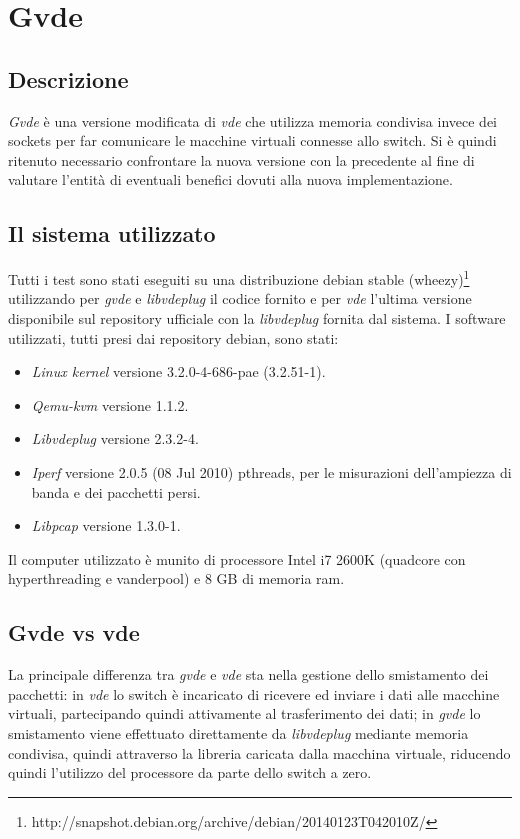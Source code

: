 \chapter{Gvde}
\section{Descrizione}
{\em Gvde} è una versione modificata di {\em vde} che utilizza memoria condivisa invece dei sockets per far comunicare le macchine virtuali connesse allo switch. Si è quindi ritenuto necessario confrontare la nuova versione con la precedente al fine di valutare l'entità di eventuali benefici dovuti alla nuova implementazione.
\section{Il sistema utilizzato}
Tutti i test sono stati eseguiti su una distribuzione debian stable (wheezy)\footnote{http://snapshot.debian.org/archive/debian/20140123T042010Z/} utilizzando per {\em gvde} e {\em libvdeplug} il codice fornito e per {\em vde} l'ultima versione disponibile sul repository ufficiale con la {\em libvdeplug} fornita dal sistema. I software utilizzati, tutti presi dai repository debian, sono stati:
\begin{itemize}
\item {\em Linux kernel} versione 3.2.0-4-686-pae (3.2.51-1).
\item {\em Qemu-kvm} versione 1.1.2.
\item {\em Libvdeplug} versione 2.3.2-4.
\item {\em Iperf} versione 2.0.5 (08 Jul 2010) pthreads, per le misurazioni dell'ampiezza di banda e dei pacchetti persi.
\item {\em Libpcap} versione 1.3.0-1.
\end{itemize}
Il computer utilizzato è munito di processore Intel i7 2600K (quadcore con hyperthreading e vanderpool) e 8 GB di memoria ram.
\section{Gvde vs vde}
La principale differenza tra {\em gvde} e {\em vde} sta nella gestione dello smistamento dei pacchetti: in {\em vde} lo switch è incaricato di ricevere ed inviare i dati alle macchine virtuali, partecipando quindi attivamente al trasferimento dei dati; in {\em gvde} lo smistamento viene effettuato direttamente da {\em libvdeplug} mediante memoria condivisa, quindi attraverso la libreria caricata dalla macchina virtuale, riducendo quindi l'utilizzo del processore da parte dello switch a zero.

